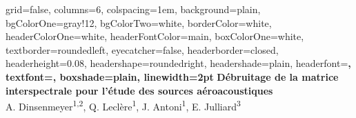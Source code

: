 \documentclass[portrait,final,a0paper,]{baposter}
\begin{document}



\begin{poster}%
  {
  grid=false,
  columns=6,
  colspacing=1em,
  background=plain,%
  bgColorOne=gray!12,%
  bgColorTwo=white,
  borderColor=white,%
  headerColorOne=white,%
  headerFontColor=main,%
  boxColorOne=white,%
  textborder=roundedleft,%
  eyecatcher=false,
  headerborder=closed,
  headerheight=0.08\textheight,
  headershape=roundedright,
  headershade=plain,%
  headerfont=\Large\bfseries,%
  textfont={\setlength{\parindent}{1.5em}},
  boxshade=plain,
  linewidth=2pt
  }
  {  }
 {
\vspace{0.4cm}\textcolor{main}{\textbf{Débruitage de la matrice interspectrale pour l'étude des sources aéroacoustiques}}}
  { ~\\A. Dinsenmeyer\textsuperscript{1,2}, Q. Leclère\textsuperscript{1}, J. Antoni\textsuperscript{1}, E. Julliard\textsuperscript{3}}
  {  }
  

\end{poster}
\end{document}

